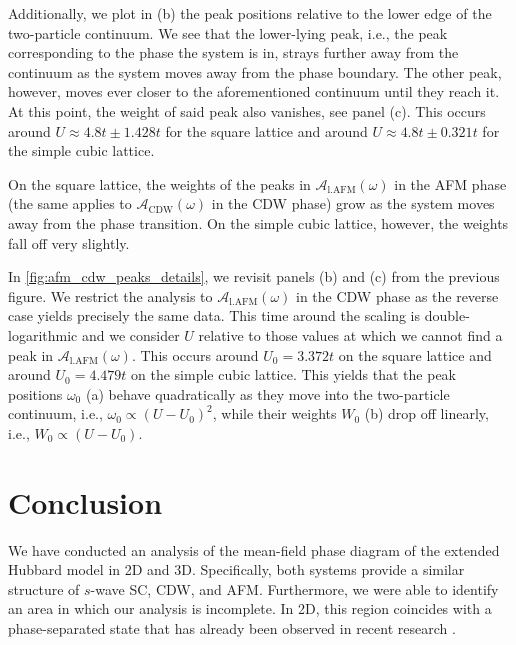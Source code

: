 \documentclass[
    reprint, 
    aps,
    preprintnumbers,
    twocolumn,
    prb,
    superscriptaddress
]{revtex4-2}
\newcommand{\spectral}[1]{\mathcal{A}_\text{#1}  (\omega)}
\begin{document}
Additionally, we plot in (b) the peak positions relative to the lower edge of the two-particle continuum.
We see that the lower-lying peak, i.e., the peak corresponding to the phase the system is in, 
strays further away from the continuum as the system moves away from the phase boundary.
The other peak, however, moves ever closer to the aforementioned continuum until they reach it.
At this point, the weight of said peak also vanishes, see panel (c).
This occurs around $U \approx 4.8t \pm 1.428t$ for the square lattice and around $U \approx 4.8t \pm 0.321t$ for the simple cubic lattice.

On the square lattice, the weights of the peaks in $\spectral{l.AFM}$ in the AFM phase (the same applies to $\spectral{CDW}$ in the CDW phase) grow as the system moves away from the phase transition.
On the simple cubic lattice, however, the weights fall off very slightly.

In \autoref{fig:afm_cdw_peaks_details}, we revisit panels (b) and (c) from the previous figure.
We restrict the analysis to $\spectral{l.AFM}$ in the CDW phase as the reverse case yields precisely the same data.
This time around the scaling is double-logarithmic and we consider $U$ relative to those values at which we cannot find a peak in $\spectral{l.AFM}$.
This occurs around $U_0 = 3.372t$ on the square lattice and around $U_0 = 4.479t$ on the simple cubic lattice.
This yields that the peak positions $\omega_0$ (a) behave quadratically as they move into the two-particle continuum, i.e., $\omega_0 \propto (U-U_0)^2$,
while their weights $W_0$ (b) drop off linearly, i.e., $W_0 \propto (U-U_0)$.


\section{Conclusion}\label{sec:conclusion}


We have conducted an analysis of the mean-field phase diagram of the extended Hubbard model in 2D and 3D. 
Specifically, both systems provide a similar structure of $s$-wave SC, CDW, and AFM.
Furthermore, we were able to identify an area in which our analysis is incomplete.
In 2D, this region coincides with a phase-separated state that has already been observed in recent research \cite{Linner23}.
\end{document}
